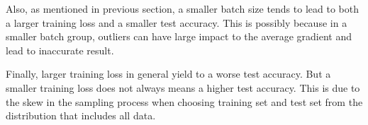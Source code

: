 \documentclass{article}
\begin{document}
Also, as mentioned in previous section, a smaller batch size tends to lead to 
both a larger training loss and a smaller test accuracy. This is possibly because
in a smaller batch group, outliers can have large impact to the average gradient
and lead to inaccurate result.

Finally, larger training loss in general yield to a worse test accuracy. But a
smaller training loss does not always means a higher test accuracy. This is due to
the skew in the sampling process when choosing training set and test set from the
distribution that includes all data.
\end{document}

